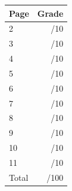 \documentclass[12pt]{article}
\begin{document}
\begin{table}[hbt]
\begin{center}
\begin{tabular}{|l|r|} \hline
Page&Grade\\
\hline \hline
\cline{1-2} 2 & \enspace\enspace\enspace\enspace\enspace\enspace/10\\
\cline{1-2} 3 & \enspace\enspace\enspace\enspace\enspace\enspace/10\\
\cline{1-2} 4 & \enspace\enspace\enspace\enspace\enspace\enspace/10\\
\cline{1-2} 5 & \enspace\enspace\enspace\enspace\enspace\enspace/10\\
\cline{1-2} 6 & \enspace\enspace\enspace\enspace\enspace\enspace/10\\
\cline{1-2} 7 & \enspace\enspace\enspace\enspace\enspace\enspace/10\\
\cline{1-2} 8 & \enspace\enspace\enspace\enspace\enspace\enspace/10\\
\cline{1-2} 9 & \enspace\enspace\enspace\enspace\enspace\enspace/10\\
\cline{1-2} 10 & \enspace\enspace\enspace\enspace\enspace\enspace/10\\
\cline{1-2} 11 & \enspace\enspace\enspace\enspace\enspace\enspace/10\\
\cline{1-2} Total & \enspace\enspace\enspace\enspace\enspace\enspace/100\\
\hline
\end{tabular}

\end{center}
\end{table}
\newpage
\end{document}
